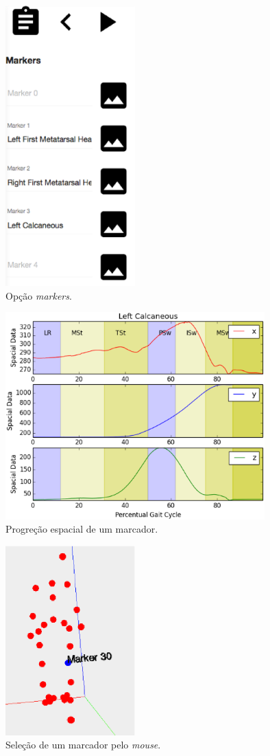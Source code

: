 \begin{figure}[ht]
	\centering
	\includegraphics[width=5cm]{figuras/tela18.eps}
	\caption{Opção \emph{markers}.}
	\label{tela18}
\end{figure}


\begin{figure}[ht]
	\centering
	\includegraphics[width=10cm]{figuras/tela19.eps}
	\caption{Progreção espacial de um marcador.}
	\label{tela19}
\end{figure}

\begin{figure}[ht]
	\centering
	\includegraphics[width=5cm]{figuras/tela20.eps}
	\caption{Seleção de um marcador pelo \emph{mouse}.}
\label{tela20}
\end{figure}


